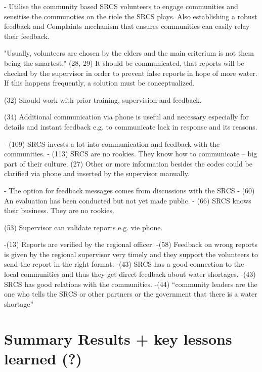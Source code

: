 -	Utilise the community based SRCS volunteers to engage communities and sensitise the communoties on the riole the SRCS plays. Also establishing a robust feedback and Complaints mechanism that ensures communities can easily relay their feedback.





"Usually, volunteers are chosen by the elders and the main criterium is not them being the smartest."
(28, 29) It should be communicated, that reports will be checked by the supervisor in order to prevent false reports in hope of more water. If this happens frequently, a solution must be conceptualized.

(32) Should work with prior training, supervision and feedback.

(34) Additional communication via phone is useful and necessary especially for details and instant feedback e.g. to communicate lack in response and its reasons.

-	(109) SRCS invests a lot into communication and feedback with the communities.
-	(113) SRCS are no rookies. They know how to communicate – big part of their culture.
(27) Other or more information besides the codes could be clarified via phone and inserted by the supervisor manually.

-	The option for feedback messages comes from discussions with the SRCS
-	(60) An evaluation has been conducted but not yet made public.
-	(66) SRCS knows their business. They are no rookies.

(53) Supervisor can validate reports e.g. vie phone.

-(13) Reports are verified by the regional officer.
-(58) Feedback on wrong reports is given by the regional supervisor very timely and they support the volunteers to send the report in the right format.
-(43) SRCS has a good connection to the local communities and thus they get direct feedback about water shortages.
-(43) SRCS has good relations with the communities.
-(44) “community leaders are the one who tells the SRCS or other partners or the government that there is a water shortage”



\section{Summary Results + key lessons learned (?)}





